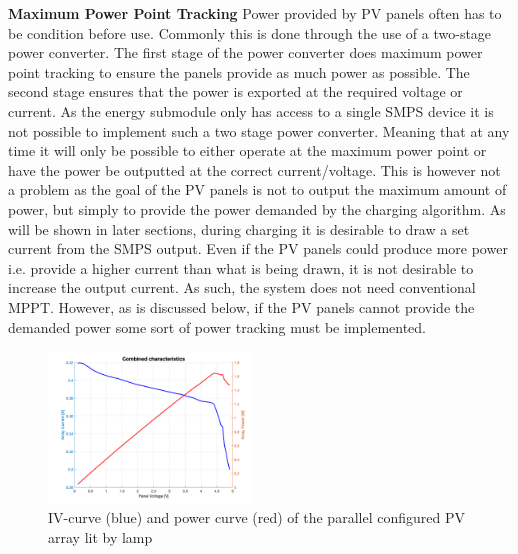 \documentclass[a4paper]{article}
\begin{document}
\textbf{Maximum Power Point Tracking}
\vspace{10pt} 
\newline
Power provided by PV panels often has to be condition before use. Commonly this 
is done through the use of a two-stage power converter. The first stage of the power
converter does maximum power point tracking to ensure the panels provide as 
much power as possible. The second stage ensures that the power is exported at the
required voltage or current\cite{green}. As the energy submodule only has
access to a single SMPS device it is not possible to implement such a two stage
power converter. Meaning that at any time it will only be possible to either operate 
at the maximum power point or have the power be outputted at the correct current/voltage.
This is however not a problem as the goal of the PV panels is not to output the 
maximum amount of power, but simply to provide the power demanded by the charging algorithm. 
As will be shown in later sections, during charging it is desirable to draw a set
current from the SMPS output. Even if the PV panels could produce more power i.e.
provide a higher current than what is being drawn, it is not desirable to increase 
the output current. As such, the system does not need conventional MPPT. However,
as is discussed below, if the PV panels cannot provide the demanded power some sort 
of power tracking must be implemented. 

\begin{figure}
    \begin{center}
        \includegraphics[width=0.48\textwidth]{Combined.png}
    \vspace{-15pt}
    \end{center}
    \caption{IV-curve (blue) and power curve (red) of the parallel configured PV array lit by lamp}
    \label{fig:parallelArray}
\end{figure}
\end{document}
